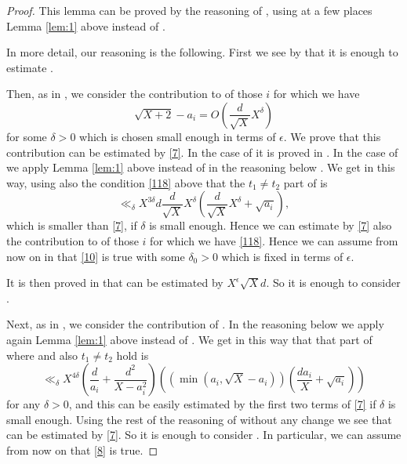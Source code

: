 \documentclass[12pt]{amsart}
\theoremstyle{definition}
\numberwithin{equation}{section}
\begin{document}
\begin{proof}This lemma can be proved by the reasoning
of \cite[Section 6]{Biro}, using at a
few places Lemma \ref{lem:1} above instead of
\cite[(3.20)]{Biro}.

In more detail, our reasoning is the following. First we see by
\cite[(6.3)-(6.7)]{Biro} that it is enough to
estimate \cite[(6.5), (6.6) and (6.7)]{Biro}.

Then, as in \cite[Subsection 6.2]{Biro}, we consider the contribution to
\cite[(6.5), (6.6) and (6.7)]{Biro} of those $i$ for which we have
\begin{equation}\sqrt {X+2}-a_i=O\left(\frac d{\sqrt {X}}X^{\delta}\right
)\label{118}\end{equation}
for some $\delta >0$ which is chosen small enough in terms of
$\epsilon$. We prove that this contribution can be estimated by
\eqref{7}. In the case of \cite[(6.7) and (6.5)]{Biro} it is proved in
\cite[Subsection 6.2]{Biro}. In the case of \cite[(6.6)]{Biro}
we apply Lemma \ref{lem:1} above instead of
\cite[(3.20)]{Biro} in the reasoning below \cite[(6.22)]{Biro}.
We get in this way, using also the condition \eqref{118}
above that the $t_1\neq t_2$ part of
\cite[(6.22)]{Biro} is
\[\ll_{\delta}X^{3\delta}d\frac d{\sqrt {X}}X^{\delta}\left(\frac
d{\sqrt {X}}X^{\delta}+\sqrt {a_i}\right),\]
which is smaller than \eqref{7}, if $\delta$ is small
enough. Hence we can estimate by \eqref{7} also the contribution to \cite[(6.6)]{Biro} of those $
i$ for which
we have \eqref{118}. Hence we can assume from now on in \cite[(6.5), (6.6) and (6.7)]{Biro} that \eqref{10} is true with some $
\delta_0>0$ which is fixed in terms of $\epsilon$.

It is then proved in \cite[Subsection 6.4]{Biro} that
\cite[(6.5)]{Biro} can be estimated by $X^{\epsilon}\sqrt {X}d$. So it is
enough to consider \cite[(6.6) and (6.7)]{Biro}.

Next, as in \cite[Subsection 6.5]{Biro}, we consider the
contribution of \cite[(6.6)]{Biro}. In the reasoning below
\cite[(6.39)]{Biro} we apply again Lemma \ref{lem:1} above instead of
\cite[(3.20)]{Biro}. We get in this way that that part of
\cite[(6.6)]{Biro} where \cite[(6.36) and (6.37)]{Biro} and
also $t_1\neq t_2$ hold is
\[\ll_{\delta}X^{4\delta}\left(\frac d{a_i}+\frac {d^2}{X-a_i^2}\right
)\left(\left(\min\left(a_i,\sqrt {X}-a_i\right)\right)\left(\frac {
da_i}X+\sqrt {a_i}\right)\right)\]
for any $\delta >0$, and this can be easily estimated by the
first two terms of \eqref{7} if $\delta$ is small enough. Using
the rest of the reasoning of \cite[Subsection 6.5]{Biro}
without any change we see that \cite[(6.6)]{Biro} can be
estimated by \eqref{7}. So it is enough to consider
\cite[(6.7)]{Biro}. In particular, we can assume from now
on that \eqref{8} is true.


\end{proof}
\end{document}
